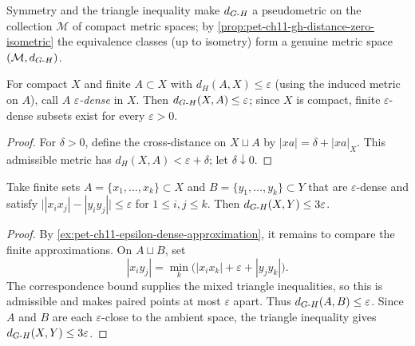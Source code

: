 \begin{remark}
  \label{rem:pet-ch11-gh-pseudo-metric-quotient}

  Symmetry and the triangle inequality make $d_{G\text{-}H}$ a pseudometric on the
  collection $\mathcal{M}$ of compact metric
  spaces; by \cref{prop:pet-ch11-gh-distance-zero-isometric} the equivalence
  classes (up to isometry) form a genuine metric space $(\mathcal{M},d_{G\text{-}H})$.
\end{remark}

\begin{example}
  \label{ex:pet-ch11-epsilon-dense-approximation}

  For compact $X$ and finite $A\subset X$ with $d_H(A,X)\le\varepsilon$
  (using the induced metric on $A$), call $A$ \emph{$\varepsilon$-dense} in
  $X$. Then $d_{G\text{-}H}(X,A)\le\varepsilon$; since $X$ is compact, finite
  $\varepsilon$-dense subsets exist for every $\varepsilon>0$.
\end{example}
\begin{proof}
  \sketch
  For \(\delta>0\), define the cross-distance on \(X\sqcup A\) by
  \(|xa|=\delta+|xa|_X\). This admissible metric has
  \(d_H(X,A)<\varepsilon+\delta\); let \(\delta\downarrow0\).
\end{proof}


\begin{example}
  \label{ex:pet-ch11-finite-approximation-3eps}

  Take finite sets
  $A=\{x_1,\dots,x_k\}\subset X$ and $B=\{y_1,\dots,y_k\}\subset Y$ that are
  $\varepsilon$-dense and satisfy
  $\big||x_ix_j|-|y_iy_j|\big|\le\varepsilon$ for $1\le i,j\le k$. Then
  $d_{G\text{-}H}(X,Y)\le3\varepsilon$.
\end{example}
\begin{proof}
  \sketch
  By \cref{ex:pet-ch11-epsilon-dense-approximation}, it remains to compare
  the finite approximations. On \(A\sqcup B\), set
  \[
    |x_i y_j|=\min_k\bigl(|x_i x_k|+\varepsilon+|y_jy_k|\bigr).
  \]
  The correspondence bound supplies the mixed triangle inequalities, so this is admissible and makes paired points at most \(\varepsilon\) apart. Thus \(d_{G\text{-}H}(A,B)\le\varepsilon\). Since \(A\) and \(B\) are each \(\varepsilon\)-close to the ambient space, the triangle inequality gives \(d_{G\text{-}H}(X,Y)\le3\varepsilon\).
\end{proof}


